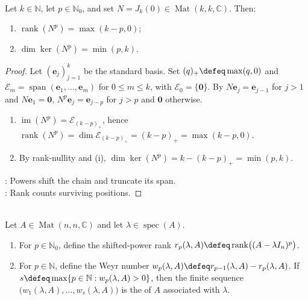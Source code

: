 \begin{lemma} \label{lem:nilpotent-jordan-block-power-rank} \\
Let $k\in\mathbb{N}$, let $p\in\mathbb{N}_0$, and set $N=J_k(0)\in\operatorname{Mat}(k,k,\mathbb{C})$. Then:
\begin{enumerate}[label=(\roman*)]
\setlength{\itemsep}{0pt}
\item $\operatorname{rank}(N^p)=\max(k-p,0)$;
\item $\dim\ker(N^p)=\min(p,k)$.
\end{enumerate}
\begin{proof}
Let $(\mathbf{e}_j)_{j=1}^k$ be the standard basis. Set $(q)_+\defeq\max(q,0)$ and $\mathcal{E}_m=\operatorname{span}(\mathbf{e}_1,\ldots,\mathbf{e}_m)$ for $0\leq m\leq k$, with $\mathcal{E}_0=\{\mathbf{0}\}$. By $N\mathbf{e}_j=\mathbf{e}_{j-1}$ for $j>1$ and $N\mathbf{e}_1=\mathbf{0}$, $N^p\mathbf{e}_j=\mathbf{e}_{j-p}$ for $j>p$ and $\mathbf{0}$ otherwise.
\begin{enumerate}[label=(\roman*)]
\setlength{\itemsep}{0pt}
\item $\operatorname{im}(N^p)=\mathcal{E}_{(k-p)_+}$, hence $\operatorname{rank}(N^p)=\dim\mathcal{E}_{(k-p)_+}=(k-p)_+=\max(k-p,0)$.
\item By rank-nullity and (i), $\dim\ker(N^p)=k-(k-p)_+=\min(p,k)$.
\end{enumerate}
: Powers shift the chain and truncate its span.\\
: Rank counts surviving positions.
\end{proof}
\end{lemma}

\begin{definition} \label{def:weyr-characteristic} \\
Let $A\in\operatorname{Mat}(n,n,\mathbb{C})$ and let $\lambda\in\operatorname{spec}(A)$.
\begin{enumerate}[label=(\roman*)]
\setlength{\itemsep}{0pt}
\item For $p\in\mathbb{N}_0$, define the shifted-power rank $r_p(\lambda,A)\defeq\operatorname{rank}\bigl((A-\lambda I_n)^p\bigr)$.
\item For $p\in\mathbb{N}$, define the Weyr number $w_p(\lambda,A)\defeq r_{p-1}(\lambda,A)-r_p(\lambda,A)$. If $s\defeq\max\{p\in\mathbb{N}:w_p(\lambda,A)>0\}$, then the finite sequence $\bigl(w_1(\lambda,A),\ldots,w_s(\lambda,A)\bigr)$ is the  of $A$ associated with $\lambda$.
\end{enumerate}
\end{definition}

